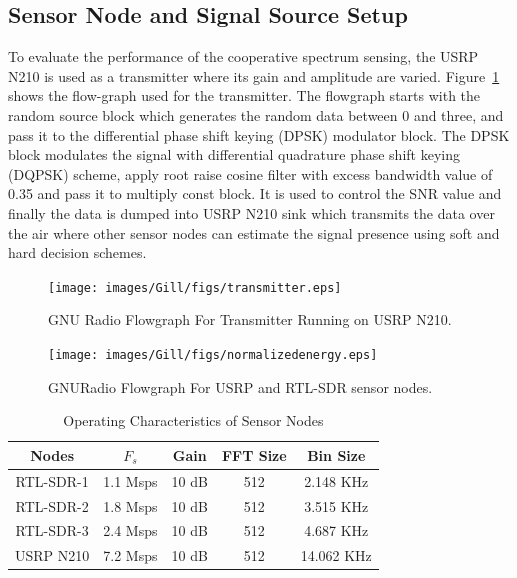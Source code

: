 \subsection{Sensor Node and Signal Source Setup}
To evaluate the performance of the cooperative spectrum sensing, the USRP N210 is used as a transmitter where its gain and amplitude are varied. Figure~\ref{transmitter} shows the flow-graph used for the transmitter. The flowgraph starts with the random source block which generates the random data between 0 and three, and pass it to the differential phase shift keying (DPSK) modulator block. The DPSK block modulates the signal with differential quadrature phase shift keying (DQPSK) scheme, apply root raise cosine filter with excess bandwidth value of 0.35 and pass it to multiply const block. It is used to control the SNR value and finally the data is dumped into USRP N210 sink which transmits the data over the air where other sensor nodes can estimate the signal presence using soft and hard decision schemes.

\begin{figure}[ht!]
	\centering
	\texttt{[image: images/Gill/figs/transmitter.eps]}
    \caption{GNU Radio Flowgraph For Transmitter Running on USRP N210.} 
\label{transmitter}      
\end{figure}

\begin{figure}[ht!]
	\centering
	\texttt{[image: images/Gill/figs/normalizedenergy.eps]}
    \caption{GNURadio Flowgraph For USRP and RTL-SDR sensor nodes.} 
\label{receiver}      
\end{figure}

\begin{table}[!ht]
\caption{Operating Characteristics of Sensor Nodes}
\centering
\vspace{-5pt}
\begin{tabular}{c c c c c}
\toprule
Nodes      & $F_s$     & Gain  & FFT Size &  Bin Size \\ \hline
RTL-SDR-1  & 1.1 Msps  & 10 dB & 512      & 2.148 KHz \\ \hline
RTL-SDR-2  & 1.8 Msps  & 10 dB & 512      & 3.515 KHz\\ \hline
RTL-SDR-3  & 2.4 Msps  & 10 dB & 512      & 4.687 KHz\\ \hline
USRP N210  & 7.2 Msps  & 10 dB & 512     &  14.062 KHz\\ 
\bottomrule
\end{tabular}
\vspace{-5pt}
\label{table1}
\end{table}


